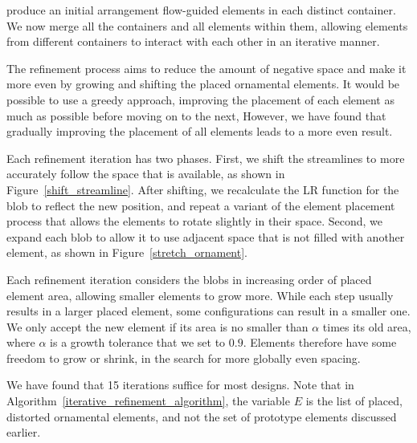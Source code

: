 
\newtext
{
 produce an initial arrangement  
flow-guided elements in each distinct container.
We now merge all the containers and all elements within them,
allowing elements from different containers to interact with each other 
in an iterative manner.
}


The refinement process aims to reduce the amount of negative space and make it
more even by growing and shifting the placed ornamental elements. It would be 
possible to use a greedy approach, improving the placement of each element as much
as possible before moving on to the next, However, we have found that gradually
improving the placement of all elements leads to a more even result.

Each refinement iteration has two phases.
First, we shift the streamlines to more accurately follow the space that is available,
as shown in Figure~\ref{shift_streamline}. After shifting, we recalculate the LR function
for the blob to reflect the new position, and repeat a variant of the
element placement process
that allows the elements to rotate slightly in their space.
Second, we expand each blob to allow it to use adjacent space that is not 
filled with another element, as shown in Figure~\ref{stretch_ornament}.

Each refinement iteration considers the blobs in increasing order of 
placed element area, allowing smaller elements to grow more.   While each step
usually results in a larger placed element, some
configurations can result in a smaller one. We only accept the new element if its
area is no smaller than $\alpha$ times its old area, where $\alpha$ is a growth tolerance
that we set to $0.9$. Elements therefore have some freedom to grow or
shrink, in the search for more globally even spacing.

We have found that 15 iterations suffice for most designs.
Note that in Algorithm~\ref{iterative_refinement_algorithm}, the variable
$E$ is the list of placed, distorted ornamental elements, and
not the set of prototype elements discussed earlier.

